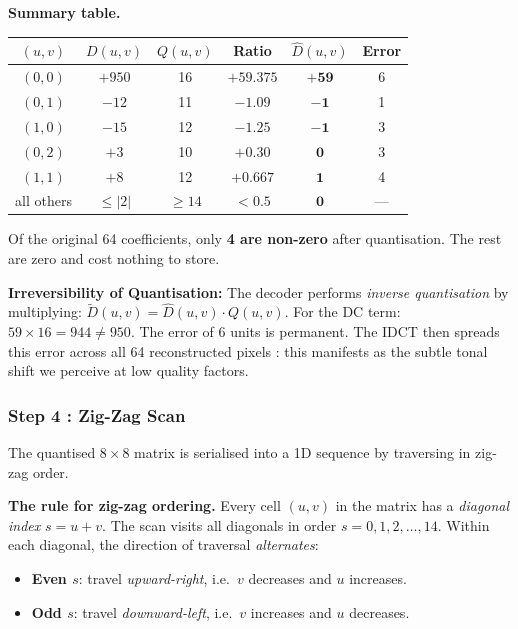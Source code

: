 \begin{examplebox}
\medskip
\noindent\textbf{Summary table.}

\begin{center}
\setlength{\tabcolsep}{8pt}
\begin{tabular}{cccccc}
\toprule
$(u,v)$ & $D(u,v)$ & $Q(u,v)$ & Ratio & $\hat{D}(u,v)$ & Error \\
\midrule
$(0,0)$ & $+950$ & 16 & $+59.375$ & $\mathbf{+59}$ & 6 \\
$(0,1)$ & $-12$  & 11 & $-1.09$   & $\mathbf{-1}$  & 1 \\
$(1,0)$ & $-15$  & 12 & $-1.25$   & $\mathbf{-1}$  & 3 \\
$(0,2)$ & $+3$   & 10 & $+0.30$   & $\mathbf{0}$   & 3 \\
$(1,1)$ & $+8$   & 12 & $+0.667$  & $\mathbf{1}$   & 4 \\
all others & $\le|2|$ & $\ge14$ & $<0.5$ & $\mathbf{0}$ & --- \\
\bottomrule
\end{tabular}
\end{center}

Of the original 64 coefficients, only \textbf{4 are non-zero} after quantisation.
The rest are zero and cost nothing to store.
\end{examplebox}

\begin{warningbox}
\textbf{Irreversibility of Quantisation:} The decoder performs \emph{inverse quantisation} by multiplying: $\tilde{D}(u,v)=\hat{D}(u,v)\cdot Q(u,v)$. For the DC term: $59\times16=944\neq950$. The error of 6 units is permanent. The IDCT then spreads this error across all 64 reconstructed pixels : this manifests as the subtle tonal shift we perceive at low quality factors.
\end{warningbox}

\subsubsection{Step 4 : Zig-Zag Scan}

The quantised $8\times8$ matrix is serialised into a 1D sequence by traversing in zig-zag order.

\textbf{The rule for zig-zag ordering.}
Every cell $(u,v)$ in the matrix has a \emph{diagonal index} $s = u + v$.
The scan visits all diagonals in order $s = 0, 1, 2, \ldots, 14$.
Within each diagonal, the direction of traversal \emph{alternates}:

\begin{itemize}
  \item \textbf{Even $s$}: travel \emph{upward-right}, i.e.\ $v$ decreases and $u$ increases.
  \item \textbf{Odd $s$}: travel \emph{downward-left}, i.e.\ $v$ increases and $u$ decreases.
\end{itemize}

